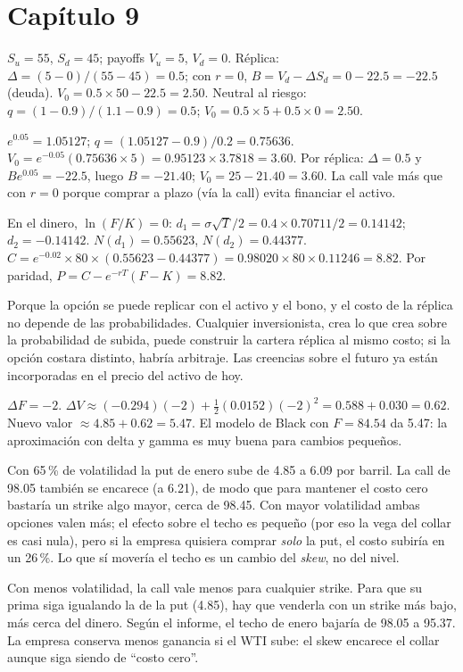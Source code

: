 \section*{Capítulo 9}

 $S_u=55$, $S_d=45$; payoffs $V_u=5$, $V_d=0$. Réplica: $\Delta=(5-0)/(55-45)=0.5$; con $r=0$, $B=V_d-\Delta S_d=0-22.5=-22.5$ (deuda). $V_0=0.5\times50-22.5=2.50$. Neutral al riesgo: $q=(1-0.9)/(1.1-0.9)=0.5$; $V_0=0.5\times5+0.5\times0=2.50$.

 $e^{0.05}=1.05127$; $q=(1.05127-0.9)/0.2=0.75636$. $V_0=e^{-0.05}(0.75636\times5)=0.95123\times3.7818=3.60$. Por réplica: $\Delta=0.5$ y $Be^{0.05}=-22.5$, luego $B=-21.40$; $V_0=25-21.40=3.60$. La call vale más que con $r=0$ porque comprar a plazo (vía la call) evita financiar el activo.

 En el dinero, $\ln(F/K)=0$: $d_1=\sigma\sqrt T/2=0.4\times0.70711/2=0.14142$; $d_2=-0.14142$. $N(d_1)=0.55623$, $N(d_2)=0.44377$. $C=e^{-0.02}\times80\times(0.55623-0.44377)=0.98020\times80\times0.11246=8.82$. Por paridad, $P=C-e^{-rT}(F-K)=8.82$.

 Porque la opción se puede replicar con el activo y el bono, y el costo de la réplica no depende de las probabilidades. Cualquier inversionista, crea lo que crea sobre la probabilidad de subida, puede construir la cartera réplica al mismo costo; si la opción costara distinto, habría arbitraje. Las creencias sobre el futuro ya están incorporadas en el precio del activo de hoy.

 $\Delta F=-2$. $\Delta V\approx(-0.294)(-2)+\tfrac12(0.0152)(-2)^2=0.588+0.030=0.62$. Nuevo valor $\approx4.85+0.62=5.47$. El modelo de Black con $F=84.54$ da 5.47: la aproximación con delta y gamma es muy buena para cambios pequeños.

 Con 65\,\% de volatilidad la put de enero sube de 4.85 a 6.09 por barril. La call de 98.05 también se encarece (a 6.21), de modo que para mantener el costo cero bastaría un strike algo mayor, cerca de 98.45. Con mayor volatilidad ambas opciones valen más; el efecto sobre el techo es pequeño (por eso la vega del collar es casi nula), pero si la empresa quisiera comprar \emph{solo} la put, el costo subiría en un 26\,\%. Lo que sí movería el techo es un cambio del \emph{skew}, no del nivel.

 Con menos volatilidad, la call vale menos para cualquier strike. Para que su prima siga igualando la de la put (4.85), hay que venderla con un strike más bajo, más cerca del dinero. Según el informe, el techo de enero bajaría de 98.05 a 95.37. La empresa conserva menos ganancia si el WTI sube: el skew encarece el collar aunque siga siendo de \enquote{costo cero}.
